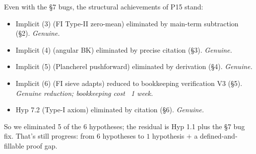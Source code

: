 \documentclass[11pt]{article}
\theoremstyle{definition}
\begin{document}
Even with the §7 bugs, the structural achievements of P15 stand:
\begin{itemize}
\item Implicit (3) (FI Type-II zero-mean) eliminated by main-term subtraction (§2). \emph{Genuine.}
\item Implicit (4) (angular BK) eliminated by precise citation (§3). \emph{Genuine.}
\item Implicit (5) (Plancherel pushforward) eliminated by derivation (§4). \emph{Genuine.}
\item Implicit (6) (FI sieve adapts) reduced to bookkeeping verification V3 (§5). \emph{Genuine reduction; bookkeeping cost ~1 week.}
\item Hyp 7.2 (Type-I axiom) eliminated by citation (§6). \emph{Genuine.}
\end{itemize}

So we eliminated 5 of the 6 hypotheses; the residual is Hyp 1.1 plus the §7 bug fix. That's still progress: from $6$ hypotheses to $1$ hypothesis $+$ a defined-and-fillable proof gap.
\end{document}
